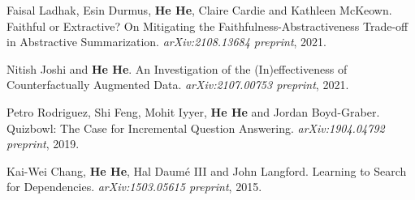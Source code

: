 Faisal Ladhak, Esin Durmus, \textbf{He He}, Claire Cardie and Kathleen McKeown. Faithful or Extractive? On Mitigating the Faithfulness-Abstractiveness Trade-off in Abstractive Summarization. \textit{arXiv:2108.13684 preprint}, 2021.

Nitish Joshi and \textbf{He He}. An Investigation of the (In)effectiveness of Counterfactually Augmented Data. \textit{arXiv:2107.00753 preprint}, 2021.

Petro Rodriguez, Shi Feng, Mohit Iyyer, \textbf{He He} and Jordan Boyd-Graber. Quizbowl: The Case for Incremental Question Answering. \textit{arXiv:1904.04792 preprint}, 2019.

Kai-Wei Chang, \textbf{He He}, Hal Daum\'e III and John Langford. Learning to Search for Dependencies. \textit{arXiv:1503.05615 preprint}, 2015.


